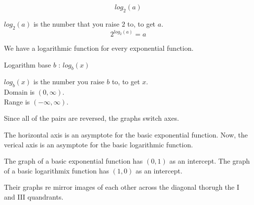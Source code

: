 \documentclass{ximera}
\begin{document}
\[   log_2(a)     \]

$log_2(a)$ is the number that you raise $2$ to, to get $a$.  \\

\[   2^{log_2(a)} = a     \]

We have a logarithmic function for every exponential function.






\begin{definition}  Logarithm base $b$ : $log_b(x)$


$log_b(x)$ is the number you raise $b$ to, to get $x$. \\

Domain is $(0, \infty)$. \\

Range is $(-\infty, \infty)$.


\end{definition}






Since all of the pairs are reversed, the graphs switch axes.



The horizontal axis is an asymptote for the basic exponential function. Now, the verical axis is an asymptote for the basic logarithmic function.


The graph of a basic exponential function has $(0,1)$ as an intercept.  The graph of a basic logarithmix function has $(1,0)$ as an intercept. 


Their graphs re mirror images of each other across the diagonal thorugh the I and III quandrants.
\end{document}
